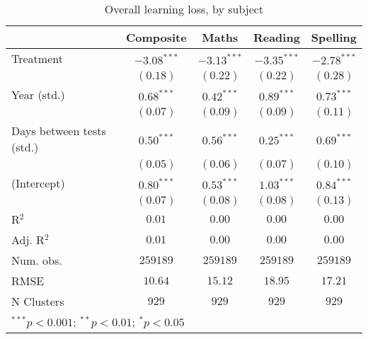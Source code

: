 
\begin{table}
\begin{center}
\begin{tabular}{l c c c c}
\hline
 & Composite & Maths & Reading & Spelling \\
\hline
Treatment                 & $-3.08^{***}$ & $-3.13^{***}$ & $-3.35^{***}$ & $-2.78^{***}$ \\
                          & $(0.18)$      & $(0.22)$      & $(0.22)$      & $(0.28)$      \\
Year (std.)               & $0.68^{***}$  & $0.42^{***}$  & $0.89^{***}$  & $0.73^{***}$  \\
                          & $(0.07)$      & $(0.09)$      & $(0.09)$      & $(0.11)$      \\
Days between tests (std.) & $0.50^{***}$  & $0.56^{***}$  & $0.25^{***}$  & $0.69^{***}$  \\
                          & $(0.05)$      & $(0.06)$      & $(0.07)$      & $(0.10)$      \\
(Intercept)               & $0.80^{***}$  & $0.53^{***}$  & $1.03^{***}$  & $0.84^{***}$  \\
                          & $(0.07)$      & $(0.08)$      & $(0.08)$      & $(0.13)$      \\
\hline
R$^2$                     & $0.01$        & $0.00$        & $0.00$        & $0.00$        \\
Adj. R$^2$                & $0.01$        & $0.00$        & $0.00$        & $0.00$        \\
Num. obs.                 & $259189$      & $259189$      & $259189$      & $259189$      \\
RMSE                      & $10.64$       & $15.12$       & $18.95$       & $17.21$       \\
N Clusters                & $929$         & $929$         & $929$         & $929$         \\
\hline
\multicolumn{5}{l}{\scriptsize{$^{***}p<0.001$; $^{**}p<0.01$; $^{*}p<0.05$}}
\end{tabular}
\caption{Overall learning loss, by subject}
\label{table:overall}
\end{center}
\end{table}

